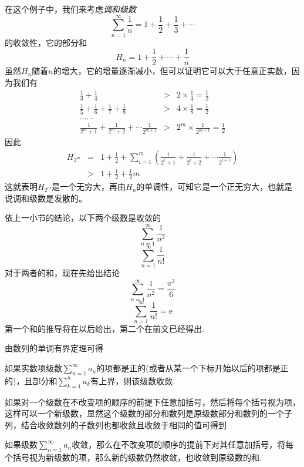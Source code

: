 \begin{example}[调和级数的发散性]
  \label{example:non-convergency-of-harmonic-series-proof-by-monotone}
  在这个例子中，我们来考虑\emph{调和级数}
  \[ \sum_{n=1}^{\infty} \frac{1}{n} = 1+\frac{1}{2} + \frac{1}{3} + \cdots  \]
  的收敛性，它的部分和
  \[ H_n = 1 + \frac{1}{2} + \cdots + \frac{1}{n} \]
  虽然$H_n$随着$n$的增大，它的增量逐渐减小，但可以证明它可以大于任意正实数，因为我们有
  \begin{eqnarray*}
    \frac{1}{3} + \frac{1}{4} & > & 2 \times \frac{1}{4} = \frac{1}{2} \\
    \frac{1}{5} + \frac{1}{6} + \frac{1}{7} + \frac{1}{8} & > & 4 \times \frac{1}{8} = \frac{1}{2} \\
    ...... && \\
    \frac{1}{2^m+1} + \frac{1}{2^m+2} + \cdots \frac{1}{2^{m+1}} & > & 2^m \times \frac{1}{2^{m+1}} = \frac{1}{2}
  \end{eqnarray*}
  因此
  \begin{eqnarray*}
    H_{2^m} & = & 1+ \frac{1}{2} + \sum_{i=1}^m \left( \frac{1}{2^i+1} + \frac{1}{2^i+2} + \cdots \frac{1}{2^{i+1}} \right) \\
    & > & 1 + \frac{1}{2} + \frac{1}{2}m
  \end{eqnarray*}
  这就表明$H_{2^m}$是一个无穷大，再由$H_n$的单调性，可知它是一个正无穷大，也就是说调和级数是发散的。
\end{example}

依上一小节的结论，以下两个级数是收敛的
\[ \sum_{n=1}^{\infty}\frac{1}{n^2}\]
\[ \sum_{n=1}^{\infty}\frac{1}{n!} \]
对于两者的和，现在先给出结论
\[ \sum_{n=1}^{\infty}\frac{1}{n^2} = \frac{\pi^2}{6}\]
\[ \sum_{n=1}^{\infty}\frac{1}{n!} = \mathrm{e} \]
第一个和的推导将在以后给出，第二个在前文已经得出.

由数列的单调有界定理可得
\begin{theorem}
  如果实数项级数$\sum_{n=1}^{\infty}a_n$的项都是正的(或者从某一个下标开始以后的项都是正的)，且部分和$\sum_{k=1}^na_k$有上界，则该级数收敛.
\end{theorem}



如果对一个级数在不改变项的顺序的前提下任意加括号，然后将每个括号视为项，这样可以一个新级数，显然这个级数的部分和数列是原级数部分和数列的一个子列，结合收敛数列的子数列也都收敛且收敛于相同的值可得到
\begin{theorem}
  如果级数$\sum_{n=1}^{\infty}a_{n}$收敛，那么在不改变项的顺序的提前下对其任意加括号，将每个括号视为新级数的项，那么新的级数仍然收敛，也收敛到原级数的和.
\end{theorem}

